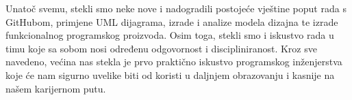 		Unatoč svemu, stekli smo neke nove i nadogradili postojeće vještine poput rada s GitHubom, primjene UML dijagrama, izrade i analize modela dizajna te izrade funkcionalnog programskog proizvoda. Osim toga, stekli smo i iskustvo rada u timu koje sa sobom nosi određenu odgovornost i discipliniranost. Kroz sve navedeno, većina nas stekla je prvo praktično iskustvo programskog inženjerstva koje će nam sigurno uvelike biti od koristi u daljnjem obrazovanju i kasnije na našem karijernom putu. 
		\eject 